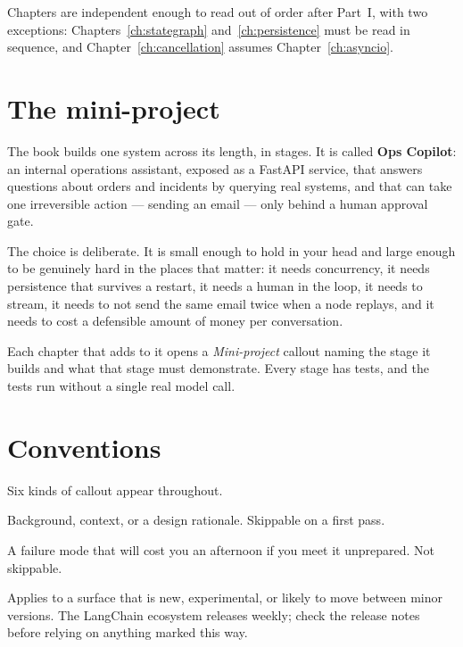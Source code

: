 Chapters are independent enough to read out of order after Part~I, with two
exceptions: Chapters~\ref{ch:stategraph} and~\ref{ch:persistence} must be read in
sequence, and Chapter~\ref{ch:cancellation} assumes
Chapter~\ref{ch:asyncio}.

\section*{The mini-project}

The book builds one system across its length, in stages. It is called
\textbf{Ops Copilot}: an internal operations assistant, exposed as a FastAPI
service, that answers questions about orders and incidents by querying real
systems, and that can take one irreversible action --- sending an email --- only
behind a human approval gate.

\begin{center}
\end{center}

The choice is deliberate. It is small enough to hold in your head and large
enough to be genuinely hard in the places that matter: it needs concurrency, it
needs persistence that survives a restart, it needs a human in the loop, it needs
to stream, it needs to not send the same email twice when a node replays, and it
needs to cost a defensible amount of money per conversation.

Each chapter that adds to it opens a \emph{Mini-project} callout naming the stage
it builds and what that stage must demonstrate. Every stage has tests, and the
tests run without a single real model call.

\section*{Conventions}

Six kinds of callout appear throughout.

\begin{note}
Background, context, or a design rationale. Skippable on a first pass.
\end{note}

\begin{warning}
A failure mode that will cost you an afternoon if you meet it unprepared.
Not skippable.
\end{warning}

\begin{versionbox}
Applies to a surface that is new, experimental, or likely to move between minor
versions. The LangChain ecosystem releases weekly; check the release notes before
relying on anything marked this way.
\end{versionbox}

